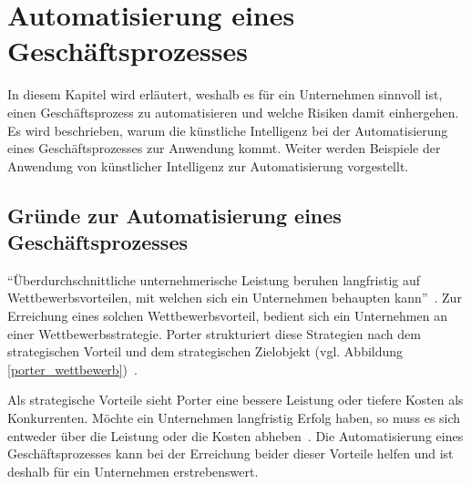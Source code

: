 \cleardoublepage
\section{Automatisierung eines Geschäftsprozesses}
\label{chap:automation}

In diesem Kapitel wird erläutert, weshalb es für ein Unternehmen sinnvoll ist, einen Geschäftsprozess zu automatisieren und welche Risiken damit einhergehen. Es wird beschrieben, warum die künstliche Intelligenz bei der Automatisierung eines Geschäftsprozesses zur Anwendung kommt. Weiter werden Beispiele der Anwendung von künstlicher Intelligenz zur Automatisierung vorgestellt.

\subsection{Gründe zur Automatisierung eines Geschäftsprozesses}

\enquote{Überdurchschnittliche unternehmerische Leistung beruhen langfristig auf Wettbewerbsvorteilen, mit welchen sich ein Unternehmen behaupten kann}~\autocite[104]{Capaul2010}. Zur Erreichung eines solchen Wettbewerbsvorteil, bedient sich ein Unternehmen an einer Wettbewerbsstrategie. Porter strukturiert diese Strategien nach dem strategischen Vorteil und dem strategischen Zielobjekt (vgl. Abbildung \ref{porter_wettbewerb})~\autocite{Capaul2010}. 

Als strategische Vorteile sieht Porter eine bessere Leistung oder tiefere Kosten als Konkurrenten. Möchte ein Unternehmen langfristig Erfolg haben, so muss es sich entweder über die Leistung oder die Kosten abheben~\autocite{Capaul2010}. Die Automatisierung eines Geschäftsprozesses kann bei der Erreichung beider dieser Vorteile helfen und ist deshalb für ein Unternehmen erstrebenswert. 


